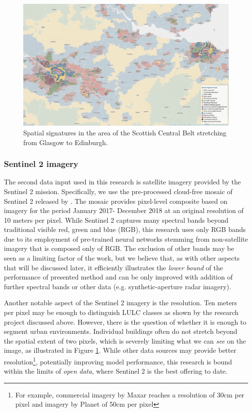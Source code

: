 \begin{figure}
    \centering
    \includegraphics[width=.8\linewidth]{fig/signatures_scotland.png}
    \caption{Spatial signatures in the area of the Scottish Central Belt stretching from Glasgow to Edinburgh.}
    \label{fig:signatures}
\end{figure}



\subsubsection{Sentinel 2 imagery}


The second data input used in this research is satellite imagery provided by the
Sentinel 2 mission. Specifically, we use the pre-processed cloud-free mosaic of Sentinel
2 released by \cite{CORBANE2020105737}.
The mosaic provides pixel-level composite based on imagery for the period January 2017-
December 2018 at an original resolution of 10 meters per pixel. While Sentinel 2
captures many spectral bands beyond traditional visible red, green and blue (RGB), this
research uses only RGB bands due to its employment of pre-trained neural networks
stemming from non-satellite imagery that is composed only of RGB. The exclusion of other
bands may be seen as a limiting factor of the work, but we believe that, as with other
aspects that will be discussed later, it efficiently illustrates the \textit{lower
bound} of the performance of presented method and can be only improved with addition of
further spectral bands or other data (e.g. synthetic-aperture radar imagery).

Another notable aspect of the Sentinel 2 imagery is the resolution. Ten meters per pixel
may be enough to distinguish LULC classes as shown by the research project discussed
above. However, there is the question of whether it is enough to segment urban
environments. Individual buildings often do not stretch beyond the spatial extent of two
pixels, which is severely limiting what we can \textit{see} on the image, as illustrated
in Figure \ref{fig:signatures}. While other data sources may provide better
resolution\footnote{For example, commercial imagery by Maxar reaches a resolution of
30cm per pixel and imagery by Planet of 50cm per pixel}, potentially improving model
performance, this research is bound within the limits of \textit{open data}, where
Sentinel 2 is the best offering to date.


